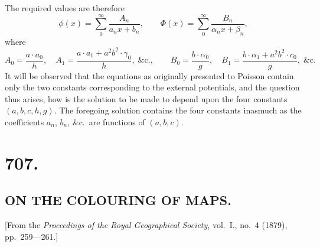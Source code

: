 \documentclass[11pt,a4paper]{book}
\begin{document}
The required values are therefore
\[
\phi(x) = \sum_0^\infty\frac{A_n}{a_n x+b_n},\qquad
\Phi(x) = \sum_0^\infty\frac{B_n}{\alpha_n x+\beta_n},
\]
where
\[
A_0 = \frac{a\cdot a_0}{h},\quad
A_1 = \frac{a\cdot a_1 + a^2b^2\cdot\gamma_0}{h},\;\&\text{c.},\qquad
B_0 = \frac{b\cdot\alpha_0}{g},\quad
B_1 = \frac{b\cdot\alpha_1 + a^2b^2\cdot c_0}{g},\;\&\text{c.}
\]
It will be observed that the equations as originally presented to Poisson contain only the two constants corresponding to the external potentials, and the question thus arises, how is the solution to be made to depend upon the four constants $(a, b, c, h, g)$. The foregoing solution contains the four constants inasmuch as the coefficients $a_n$, $b_n$, $\&$c.\ are functions of $(a, b, c)$.

\vspace{2em}
\noindent\dotfill
\cleardoublepage

\section*{707.}
\subsection*{ON THE COLOURING OF MAPS.}

\begin{center}
[From the \textit{Proceedings of the Royal Geographical Society}, vol.~I., no.~4 (1879),\\ pp.~259---261.]
\end{center}
\medskip
\end{document}
